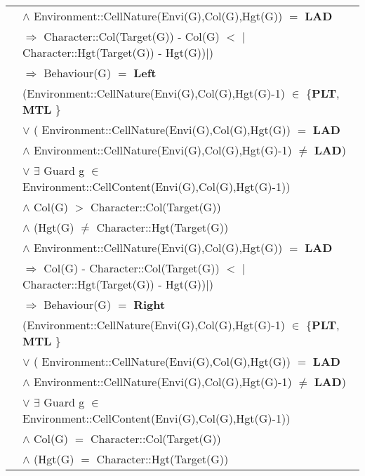 \documentclass[8pt]{article}
\begin{document}
{\begin{longtable}{rl}
  & \quad\quad\quad\quad $\land$ \textrm{Environment::CellNature(Envi(G),Col(G),Hgt(G))} $=$ \textbf{LAD}\\
  & \quad\quad\quad\quad $\Rightarrow$ \textrm{Character::Col(Target(G)) - Col(G)} $<$ $|$\textrm{Character::Hgt(Target(G)) - Hgt(G)})$|$) \\
  & \quad\quad $\Rightarrow$ \textrm{Behaviour(G)} $=$ \textbf{Left} \\ 
  & (\textrm{Environment::CellNature(Envi(G),Col(G),Hgt(G)-1)} $\in$ \{\textbf{PLT}, \textbf{MTL}  \} \\
  & \quad\quad\quad\quad $\lor$ ( \textrm{Environment::CellNature(Envi(G),Col(G),Hgt(G))} $=$ \textbf{LAD} \\
  & \quad\quad\quad\quad\quad\quad $\land$ \textrm{Environment::CellNature(Envi(G),Col(G),Hgt(G)-1)} $\neq$ \textbf{LAD}) \\
  & \quad\quad\quad\quad $\lor$ $\exists$ \textrm{Guard} g $\in$ \textrm{Environment::CellContent(Envi(G),Col(G),Hgt(G)-1)}) \\
  & \quad\quad $\land$ \textrm{Col(G)} $>$ \textrm{Character::Col(Target(G))} \\
  & \quad\quad $\land$ (\textrm{Hgt(G)} $\neq$ \textrm{Character::Hgt(Target(G))} \\
  & \quad\quad\quad\quad $\land$ \textrm{Environment::CellNature(Envi(G),Col(G),Hgt(G))} $=$ \textbf{LAD}\\
  & \quad\quad\quad\quad $\Rightarrow$ \textrm{Col(G) - Character::Col(Target(G))} $<$ $|$\textrm{Character::Hgt(Target(G)) - Hgt(G)})$|$) \\
  & \quad\quad $\Rightarrow$ \textrm{Behaviour(G)} $=$ \textbf{Right} \\
  & (\textrm{Environment::CellNature(Envi(G),Col(G),Hgt(G)-1)} $\in$ \{\textbf{PLT}, \textbf{MTL}  \} \\
  & \quad\quad\quad\quad $\lor$ ( \textrm{Environment::CellNature(Envi(G),Col(G),Hgt(G))} $=$ \textbf{LAD} \\
  & \quad\quad\quad\quad\quad\quad $\land$ \textrm{Environment::CellNature(Envi(G),Col(G),Hgt(G)-1)} $\neq$ \textbf{LAD}) \\
  & \quad\quad\quad\quad $\lor$ $\exists$ \textrm{Guard} g $\in$ \textrm{Environment::CellContent(Envi(G),Col(G),Hgt(G)-1)}) \\
  & \quad\quad $\land$ \textrm{Col(G)} $=$ \textrm{Character::Col(Target(G))} \\
  & \quad\quad $\land$ (\textrm{Hgt(G)} $=$ \textrm{Character::Hgt(Target(G))} \\

\end{longtable}}
\end{document}
